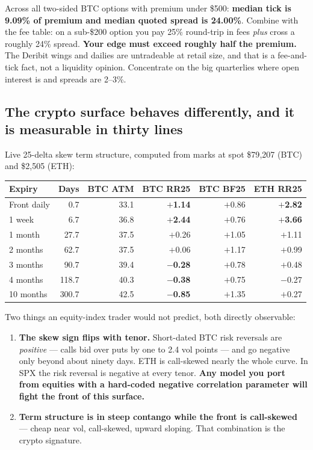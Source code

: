 \documentclass[11pt,a4paper]{article}
\begin{document}
Across all two-sided BTC options with premium under \$500: \textbf{median tick is
9.09\% of premium and median quoted spread is 24.00\%}. Combine with the fee
table: on a sub-\$200 option you pay 25\% round-trip in fees \emph{plus} cross a
roughly 24\% spread. \textbf{Your edge must exceed roughly half the premium.} The
Deribit wings and dailies are untradeable at retail size, and that is a fee-and-tick
fact, not a liquidity opinion. Concentrate on the big quarterlies where open
interest is and spreads are 2--3\%.

\subsection{The crypto surface behaves differently, and it is measurable in thirty lines}

Live 25-delta skew term structure, computed from marks at spot \$79{,}207 (BTC)
and \$2{,}505 (ETH):

\begin{center}
\begin{tabular}{@{}lrrrrr@{}}
\toprule
Expiry & Days & BTC ATM & BTC RR25 & BTC BF25 & ETH RR25 \\
\midrule
Front daily & 0.7   & 33.1 & \textbf{$+$1.14} & $+$0.86 & \textbf{$+$2.82} \\
1 week      & 6.7   & 36.8 & \textbf{$+$2.44} & $+$0.76 & \textbf{$+$3.66} \\
1 month     & 27.7  & 37.5 & $+$0.26 & $+$1.05 & $+$1.11 \\
2 months    & 62.7  & 37.5 & $+$0.06 & $+$1.17 & $+$0.99 \\
3 months    & 90.7  & 39.4 & \textbf{$-$0.28} & $+$0.78 & $+$0.48 \\
4 months    & 118.7 & 40.3 & \textbf{$-$0.38} & $+$0.75 & $-$0.27 \\
10 months   & 300.7 & 42.5 & \textbf{$-$0.85} & $+$1.35 & $+$0.27 \\
\bottomrule
\end{tabular}
\end{center}

Two things an equity-index trader would not predict, both directly observable:

\begin{enumerate}
\item \textbf{The skew sign flips with tenor.} Short-dated BTC risk reversals are
\emph{positive} --- calls bid over puts by one to 2.4 vol points --- and go
negative only beyond about ninety days. ETH is call-skewed nearly the whole curve.
In SPX the risk reversal is negative at every tenor. \textbf{Any model you port
from equities with a hard-coded negative correlation parameter will fight the
front of this surface.}
\item \textbf{Term structure is in steep contango while the front is call-skewed}
--- cheap near vol, call-skewed, upward sloping. That combination is the crypto
signature.
\end{enumerate}
\end{document}
